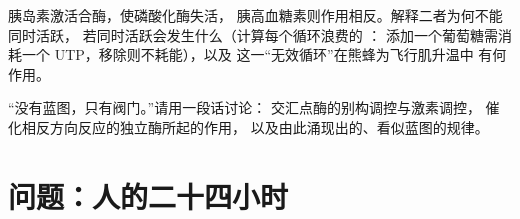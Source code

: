 \begin{exercise}[$\star\star\star$]\label{exo:b1:biosyntheses-integration:11}
胰岛素激活合酶，使磷酸化酶失活，
胰高血糖素则作用相反。解释二者为何不能同时活跃，
若同时活跃会发生什么（计算每个循环浪费的 ：
添加一个葡萄糖需消耗一个 UTP，移除则不耗能），以及
这一“无效循环”在熊蜂为飞行肌升温中
有何作用。
\end{exercise}

\begin{exercise}[$\star\star\star$]\label{exo:b1:biosyntheses-integration:12}
“没有蓝图，只有阀门。”请用一段话讨论：
交汇点酶的别构调控与激素调控，
催化相反方向反应的独立酶所起的作用，
以及由此涌现出的、看似蓝图的规律。
\end{exercise}

\section{问题：人的二十四小时}

